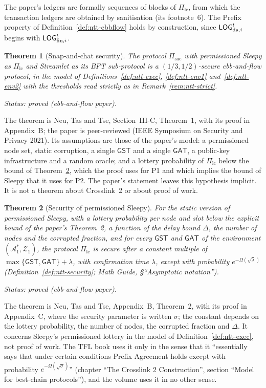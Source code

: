 \documentclass[11pt,a4paper]{article}
\newtheorem{theorem}{Theorem}[section]
\theoremstyle{definition}
\newcommand{\Adv}{\mathcal{A}}
\newcommand{\Pilc}{\Pi_{\mathrm{lc}}}
\newcommand{\Pisac}{\Pi_{\mathrm{sac}}}
\newcommand{\GST}{\mathsf{GST}}
\newcommand{\GAT}{\mathsf{GAT}}
\newcommand{\Env}{\mathcal{Z}}
\begin{document}
The paper's ledgers are formally sequences of blocks of $\Pilc$, from which
the transaction ledgers are obtained by sanitisation (its footnote~6). The
Prefix property of Definition~\ref{def:ntt-ebbflow} holds by construction,
since $\LOGda[i]^t$ begins with $\LOGfin[i]^t$.

\begin{theorem}[Snap-and-chat security]\label{thm:sac-secure}
The protocol $\Pisac$ with permissioned Sleepy as $\Pilc$ and Streamlet as
its BFT sub-protocol is a $(1/3, 1/2)$-secure ebb-and-flow protocol, in the
model of Definitions~\ref{def:ntt-exec}, \ref{def:ntt-env1}
and~\ref{def:ntt-env2} with the thresholds read strictly as in
Remark~\ref{rem:ntt-strict}.

Status: proved (ebb-and-flow paper).
\end{theorem}

The theorem is Neu, Tas and Tse, Section~III-C, Theorem~1, with its proof in
Appendix~B; the paper is peer-reviewed (IEEE Symposium on Security and
Privacy 2021). Its assumptions are those of the paper's model: a
permissioned node set, static corruption, a single $\GST$ and a single
$\GAT$, a public-key infrastructure and a random oracle; and a lottery
probability of $\Pilc$ below the bound of Theorem~\ref{thm:sleepy-secure},
which the proof uses for P1 and which implies the bound of Sleepy that it
uses for P2. The paper's statement leaves this hypothesis implicit. It is not
a theorem about Crosslink~2 or about proof of work.

\begin{theorem}[Security of permissioned Sleepy]\label{thm:sleepy-secure}
For the static version of permissioned Sleepy, with a lottery probability per
node and slot below the explicit bound of the paper's Theorem~2, a function
of the delay bound $\Delta$, the number of nodes and the corrupted fraction,
and for every $\GST$ and $\GAT$ of the environment $(\Adv_1^*, \Env_1)$, the
protocol $\Pilc$ is secure after a constant multiple of
$\max\{\GST, \GAT\} + \lambda$, with confirmation time $\lambda$, except with
probability $e^{-\Omega(\sqrt{\lambda})}$ (Definition~\ref{def:ntt-security};
\emph{Math Guide}, \S``Asymptotic notation'').

Status: proved (ebb-and-flow paper).
\end{theorem}

The theorem is Neu, Tas and Tse, Appendix~B, Theorem~2, with its proof in
Appendix~C, where the security parameter is written $\sigma$; the constant
depends on the lottery probability, the number of nodes, the corrupted fraction
and $\Delta$. It concerns Sleepy's permissioned lottery in the model of
Definition~\ref{def:ntt-exec}, not proof of work. The TFL book uses it only
in the sense that it ``essentially says that under certain conditions Prefix
Agreement holds except with probability $e^{-\Omega(\sqrt{\sigma})}$''
(chapter ``The Crosslink 2 Construction'', section ``Model for best-chain
protocols''), and the volume uses it in no other sense.
\end{document}
